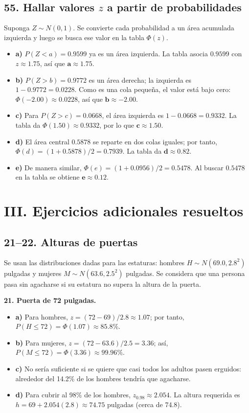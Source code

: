 \documentclass[11pt]{article}
\begin{document}
\subsection*{55. Hallar valores $z$ a partir de probabilidades}
Suponga $Z\sim N(0,1)$. Se convierte cada probabilidad a un área acumulada izquierda y luego se busca ese valor en la tabla $\Phi(z)$.
\begin{itemize}
  \item \textbf{a)} $P(Z<a)=0.9599$ ya es un área izquierda. La tabla asocia $0.9599$ con $z\approx1.75$, así que $\mathbf{a\approx1.75}$.
  \item \textbf{b)} $P(Z>b)=0.9772$ es un área derecha; la izquierda es $1-0.9772=0.0228$. Como es una cola pequeña, el valor está bajo cero: $\Phi(-2.00)\approx0.0228$, así que $\mathbf{b\approx-2.00}$.
  \item \textbf{c)} Para $P(Z>c)=0.0668$, el área izquierda es $1-0.0668=0.9332$. La tabla da $\Phi(1.50)\approx0.9332$, por lo que $\mathbf{c\approx1.50}$.
  \item \textbf{d)} El área central $0.5878$ se reparte en dos colas iguales; por tanto, $\Phi(d)=(1+0.5878)/2=0.7939$. La tabla da $\mathbf{d\approx0.82}$.
  \item \textbf{e)} De manera similar, $\Phi(e)=(1+0.0956)/2=0.5478$. Al buscar $0.5478$ en la tabla se obtiene $\mathbf{e\approx0.12}$.
\end{itemize}

\endgroup
\clearpage
\begingroup
\small
\setlength{\parskip}{0.25\baselineskip}
\setlength{\itemsep}{0.1em}
\setlength{\topsep}{0.2em}
\section*{III. Ejercicios adicionales resueltos}

\subsection*{21--22. Alturas de puertas}
Se usan las distribuciones dadas para las estaturas: hombres $H\sim N(69.0,2.8^2)$ pulgadas y mujeres $M\sim N(63.6,2.5^2)$ pulgadas. Se considera que una persona pasa sin agacharse si su estatura no supera la altura de la puerta.

\textbf{21. Puerta de 72 pulgadas.}
\begin{itemize}
  \item \textbf{a)} Para hombres, $z=(72-69)/2.8\approx1.07$; por tanto, $P(H\le72)=\Phi(1.07)\approx\mathbf{85.8\%}$.
  \item \textbf{b)} Para mujeres, $z=(72-63.6)/2.5=3.36$; así, $P(M\le72)=\Phi(3.36)\approx\mathbf{99.96\%}$.
  \item \textbf{c)} No sería suficiente si se quiere que casi todos los adultos pasen erguidos: alrededor del 14.2\% de los hombres tendría que agacharse.
  \item \textbf{d)} Para cubrir al 98\% de los hombres, $z_{0.98}\approx2.054$. La altura requerida es $h=69+2.054(2.8)\approx\mathbf{74.75}$ pulgadas (cerca de 74.8).
\end{itemize}
\end{document}
